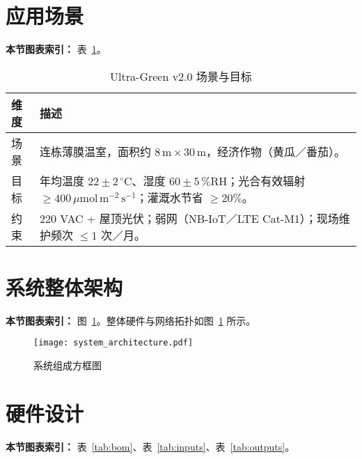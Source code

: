 \documentclass[UTF8,a4paper]{ctexart}
\newcommand{\bodyfont}{\zihao{-4}\setlength{\baselineskip}{20pt}}
\newcommand{\tabfont}{\zihao{-5}}
\begin{document}



\bodyfont
\tableofcontents
\newpage

\section{应用场景}
\textbf{本节图表索引：} 表~\ref{tab:scenario}。

\begin{table}[htbp]
    \centering
    \caption{Ultra-Green v2.0 场景与目标}
    \label{tab:scenario}
    \tabfont
    \begin{tabularx}{\textwidth}{@{}p{2.5cm}X@{}}
        \toprule
        \textbf{维度} & \textbf{描述} \\ \midrule
        场景 & 连栋薄膜温室，面积约 $8\,\mathrm{m}\times30\,\mathrm{m}$，经济作物（黄瓜／番茄）。 \\
        目标 & 年均温度 $22\pm2\,^\circ\mathrm{C}$、湿度 $60\pm5\,\%$RH；光合有效辐射 $\ge400\,\mu\mathrm{mol\,m^{-2}\,s^{-1}}$；灌溉水节省 $\ge20\%$。 \\
        约束 & 220 VAC + 屋顶光伏；弱网（NB-IoT／LTE Cat-M1）；现场维护频次 $\le1$ 次／月。 \\
        \bottomrule
    \end{tabularx}
\end{table}

\vspace{-2em}

\section{系统整体架构}
\textbf{本节图表索引：} 图~\ref{fig:sys}。整体硬件与网络拓扑如图~\ref{fig:sys} 所示。  
\begin{figure}[htbp]
    \centering
    \texttt{[image: system\_architecture.pdf]}
    \caption{系统组成方框图}
    \label{fig:sys}
\end{figure}

\section{硬件设计}
\textbf{本节图表索引：} 表~\ref{tab:bom}、表~\ref{tab:inputs}、表~\ref{tab:outputs}。
\end{document}
